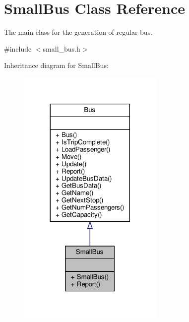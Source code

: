 \hypertarget{classSmallBus}{}\section{Small\+Bus Class Reference}
\label{classSmallBus}


The main class for the generation of regular bus.  




{\ttfamily \#include $<$small\+\_\+bus.\+h$>$}



Inheritance diagram for Small\+Bus\+:\nopagebreak
\begin{figure}[H]
\begin{center}
\leavevmode
\includegraphics[width=200pt]{classSmallBus__inherit__graph}
\end{center}
\end{figure}


